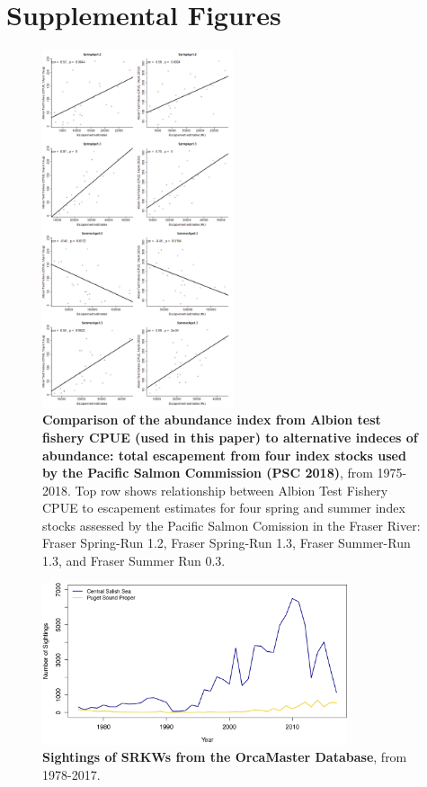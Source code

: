 \documentclass{article}
\begin{document}
\section* {Supplemental Figures}
\begin{figure}[!hp]
\includegraphics[width=0.5\textwidth]{../analyses/orcaphen/figures/ctcalbion.png}
\caption{\textbf{Comparison of the abundance index from Albion test fishery CPUE (used in this paper) to alternative indeces of abundance: total escapement from four index stocks used by the Pacific Salmon Commission (PSC 2018)}, from 1975-2018. Top row shows relationship between Albion Test Fishery CPUE to escapement estimates for four spring and summer index stocks assessed by the Pacific Salmon Comission in the Fraser River: Fraser Spring-Run 1.2, Fraser Spring-Run 1.3, Fraser Summer-Run 1.3, and Fraser Summer Run 0.3.}
\label{fig:ctcalb}
\end{figure}

\begin{figure}[!hp]
\includegraphics[width=0.8\textwidth]{../analyses/figures/OrcaPhenPlots/numsights_1976_2regs.png} 
\caption{\textbf{Sightings of SRKWs from the OrcaMaster Database}, from 1978-2017. }
\label{fig:sights}
\end{figure}
\end{document}
